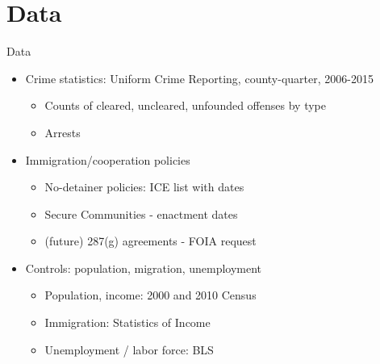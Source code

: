 \documentclass[xcolor=pdftex,dvipsnames,table,handout]{beamer}
\begin{document}
\section{Data}
\begin{frame}{Data}
\pause
\begin{itemize}
\item Crime statistics: Uniform Crime Reporting, county-quarter, 2006-2015\vspace{0.10cm}\begin{itemize}
\item Counts of cleared, uncleared, unfounded offenses by type\vspace{0.10cm}
\item Arrests
\end{itemize}\vspace{0.20cm}\pause
\item Immigration/cooperation policies\vspace{0.10cm}
\begin{itemize}
\item No-detainer policies: ICE list with dates\vspace{0.10cm}
\item Secure Communities - enactment dates\vspace{0.10cm}
\item (future) 287(g) agreements - FOIA request
\end{itemize}\vspace{0.20cm}\pause
\item Controls: population, migration, unemployment
\begin{itemize}
\item Population, income: 2000 and 2010 Census \vspace{0.10cm}
\item Immigration: Statistics of Income \vspace{0.10cm}
\item Unemployment / labor force: BLS
\end{itemize}
\end{itemize}
\end{frame}
\end{document}

